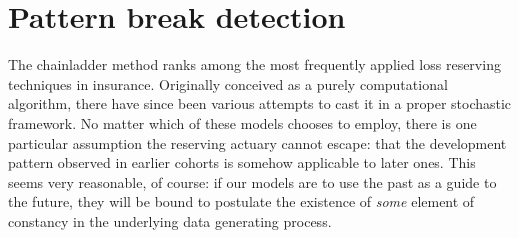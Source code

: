 \documentclass[12pt, titlepage]{article}
\begin{document}
\section{Pattern break detection}

The chainladder method ranks among the most frequently applied loss reserving techniques in insurance. Originally conceived as a purely computational algorithm, there have since been various attempts to cast it in a proper stochastic framework. No matter which of these models chooses to employ, there is one particular assumption the reserving actuary cannot escape: that the development pattern observed in earlier cohorts is somehow applicable to later ones. This seems very reasonable, of course: if our models are to use the past as a guide to the future, they will be bound to postulate the existence of \emph{some} element of constancy in the underlying data generating process. 
\end{document}
